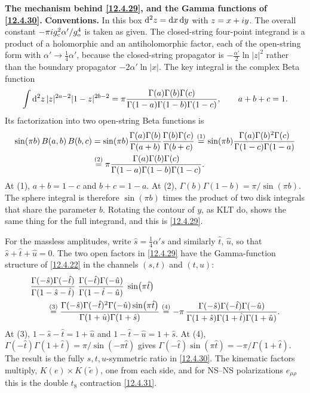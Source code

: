 \begin{tcolorbox}[breakable]
	\begin{remark}
		\textbf{The mechanism behind \eqref{12.4.29}, and the Gamma functions of \eqref{12.4.30}.} \textbf{Conventions.} In this box $\mathrm{d}^{2}z=\mathrm{d} x\,\mathrm{d} y$ with $z=x+i y$. The overall constant $-\pi i g_{\mathrm{c}}^{2}\alpha'/g_{\mathrm{o}}^{4}$ is taken as given. The closed-string four-point integrand is a product of a holomorphic and an antiholomorphic factor, each of the open-string form with $\alpha'\to\frac14\alpha'$, because the closed-string propagator is $-\frac{\alpha'}{2}\ln|z|^{2}$ rather than the boundary propagator $-2\alpha'\ln|x|$. The key integral is the complex Beta function
		\[
		\int\mathrm{d}^{2}z\,|z|^{2a-2}|1-z|^{2b-2}=\pi\frac{\Gamma(a)\Gamma(b)\Gamma(c)}{\Gamma(1-a)\Gamma(1-b)\Gamma(1-c)},\qquad a+b+c=1 .
		\]
		Its factorization into two open-string Beta functions is
		\begin{align*}
			\sin(\pi b)\,B(a,b)\,B(b,c)
			&=\sin(\pi b)\frac{\Gamma(a)\Gamma(b)}{\Gamma(a+b)}\frac{\Gamma(b)\Gamma(c)}{\Gamma(b+c)}
			\overset{(1)}{=} \sin(\pi b)\frac{\Gamma(a)\Gamma(b)^{2}\Gamma(c)}{\Gamma(1-c)\Gamma(1-a)}\\
			&\overset{(2)}{=} \pi\frac{\Gamma(a)\Gamma(b)\Gamma(c)}{\Gamma(1-a)\Gamma(1-b)\Gamma(1-c)} .
		\end{align*}
		At (1), $a+b=1-c$ and $b+c=1-a$. At (2), $\Gamma(b)\Gamma(1-b)=\pi/\sin(\pi b)$. The sphere integral is therefore $\sin(\pi b)$ times the product of two disk integrals that share the parameter $b$. Rotating the contour of $y$, as KLT do, shows the same thing for the full integrand, and this is \eqref{12.4.29}.

		For the massless amplitudes, write $\hat s=\frac14\alpha's$ and similarly $\hat t$, $\hat u$, so that $\hat s+\hat t+\hat u=0$. The two open factors in \eqref{12.4.29} have the Gamma-function structure of \eqref{12.4.22} in the channels $(s,t)$ and $(t,u)$:
		\begin{align*}
			&\frac{\Gamma(-\hat s)\Gamma(-\hat t)}{\Gamma(1-\hat s-\hat t)}\;\frac{\Gamma(-\hat t)\Gamma(-\hat u)}{\Gamma(1-\hat t-\hat u)}\;\sin(\pi\hat t)\\
			&\qquad\overset{(3)}{=} \frac{\Gamma(-\hat s)\Gamma(-\hat t)^{2}\Gamma(-\hat u)\sin(\pi\hat t)}{\Gamma(1+\hat u)\Gamma(1+\hat s)}
			\overset{(4)}{=} -\pi\,\frac{\Gamma(-\hat s)\Gamma(-\hat t)\Gamma(-\hat u)}{\Gamma(1+\hat s)\Gamma(1+\hat t)\Gamma(1+\hat u)} .
		\end{align*}
		At (3), $1-\hat s-\hat t=1+\hat u$ and $1-\hat t-\hat u=1+\hat s$. At (4), $\Gamma(-\hat t)\Gamma(1+\hat t)=\pi/\sin(-\pi\hat t)$ gives $\Gamma(-\hat t)\sin(\pi\hat t)=-\pi/\Gamma(1+\hat t)$. The result is the fully $s,t,u$-symmetric ratio in \eqref{12.4.30}. The kinematic factors multiply, $K(e)\times K(\tilde e)$, one from each side, and for NS--NS polarizations $e_{\mu\rho}$ this is the double $t_{8}$ contraction \eqref{12.4.31}.
	\end{remark}
\end{tcolorbox}

